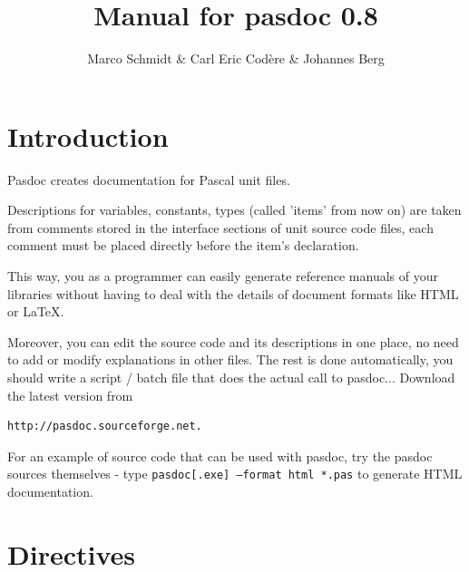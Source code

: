 \documentclass[11pt]{article}
\begin{document}
\title{Manual for pasdoc 0.8}
\author{Marco Schmidt \& Carl Eric Cod\`{e}re \& Johannes Berg}

\maketitle

\newpage

\tableofcontents

\newpage

\section{Introduction}

Pasdoc creates documentation for Pascal unit files.

Descriptions for variables, constants, types (called 'items' from now on) are
taken from comments stored in the interface sections of unit source code files,
each comment must be placed directly before the item's declaration.

This way, you as a programmer can easily generate reference manuals of your
libraries without having to deal with the details of document formats like
HTML or \LaTeX.

Moreover, you can edit the source code and its descriptions in one
place, no need to add or modify explanations in other files.
The rest is done automatically, you should write a script / batch file that
does the actual call to pasdoc...
Download the latest version from
\begin{verbatim}
http://pasdoc.sourceforge.net.
\end{verbatim}
For an example of source code that can be used with pasdoc, try the pasdoc
sources themselves - type {\tt pasdoc[.exe] --format html *.pas} to generate HTML
documentation.

\section{Directives}
\end{document}

